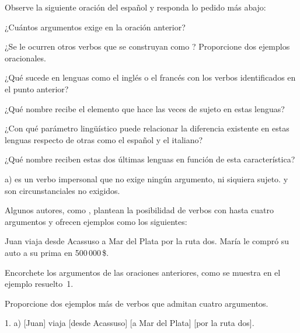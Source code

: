 \begin{ejercicio}\label{ej:06-llover}
Observe la siguiente oración del español y responda lo pedido más abajo:

\begin{center}
\end{center}

\begin{consignas}
  \item ¿Cuántos argumentos exige  en la oración anterior?
  \item ¿Se le ocurren otros verbos que se construyan como ?
        Proporcione dos ejemplos oracionales.
  \item ¿Qué sucede en lenguas como el inglés o el francés con los verbos
        identificados en el punto anterior?
  \item ¿Qué nombre recibe el elemento que hace las veces de sujeto en estas
        lenguas?
  \item ¿Con qué parámetro lingüístico puede relacionar la diferencia existente
        en estas lenguas respecto de otras como el español y el italiano?
  \item ¿Qué nombre reciben estas dos últimas lenguas en función de esta
        característica?
\end{consignas}

\begin{resuelto}
a)  es un verbo impersonal que no exige ningún argumento, ni
siquiera sujeto.  y  son
circunstanciales no exigidos.
\end{resuelto}
\end{ejercicio}

\begin{ejercicio}\label{ej:06-cuatro}
Algunos autores, como \textcite[268]{bosque2009}, plantean la posibilidad de
verbos con hasta cuatro argumentos y ofrecen ejemplos como los siguientes:

\begin{exe}
  \ex Juan viaja desde Acassuso a Mar del Plata por la ruta dos.
  \ex María le compró su auto a su prima en 500\,000\,\$.
\end{exe}

\begin{consignas}
  \item Encorchete los argumentos de las oraciones anteriores, como se muestra
        en el ejemplo resuelto~1.
  \item Proporcione dos ejemplos más de verbos que admitan cuatro argumentos.
\end{consignas}

\begin{resuelto}
1. a) [Juan] viaja [desde Acassuso] [a Mar del Plata] [por la ruta dos].
\end{resuelto}
\end{ejercicio}

